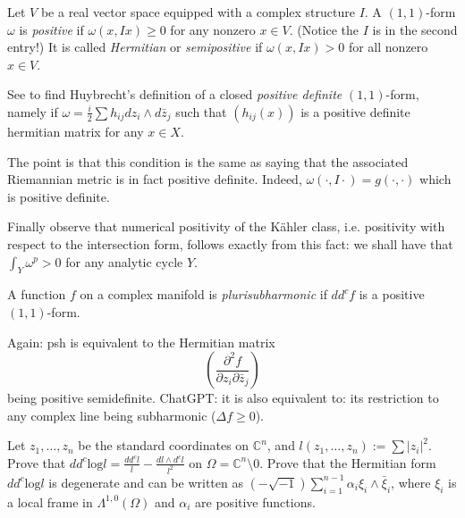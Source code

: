 \documentclass{book}
\begin{document}
\begin{definition}
\label{definition-positive-11form}
Let $V$ be a real vector space equipped with
a complex structure $I$.
A $(1,1)$-form $\omega$ is {\it positive}
if $\omega(x,Ix)\geq 0$ for any nonzero $x
\in V$.
(Notice the $I$ is in the second entry!)
It is called {\it Hermitian} or {\it
semipositive}
if $\omega(x,Ix)>0$ for all nonzero $x \in
V$.
\end{definition}

\noindent
See \cite[Lemma 3.1.7]{huc}
to find Huybrecht's definition of a closed
{\it positive definite}
$(1,1)$-form, namely if
$\omega=\frac{i}{2}\sum h_{ij}dz_i \wedge
d\bar{z}_j$
such that $(h_{ij}(x))$ is a positive
definite hermitian matrix for any $x \in X$.

The point is that this condition
is the same as saying that the associated
Riemannian metric is in fact positive
definite.
Indeed, $\omega(\cdot,I\cdot)=g(\cdot,\cdot)$
which is positive definite.

Finally observe that numerical positivity of
the
Kähler class,
i.e. positivity with respect to the
intersection form,
follows exactly from this fact: we shall have
that
$\int_Y \omega^p>0$ for any analytic cycle
$Y$.

\begin{definition}
\label{definition-psh}
A function $f$ on a complex manifold is
{\it plurisubharmonic} if $dd^cf$ is
a positive $(1,1)$-form.
\end{definition}

\noindent
Again: psh is equivalent to the Hermitian
matrix
$$
\left(\frac{\partial^2 f}{\partial
z_i\partial \bar{z}_j}\right)
$$
being positive semidefinite.
ChatGPT: it is also equivalent to: its
restriction to
any complex line being subharmonic ($\Delta
f\geq 0$).

\begin{exercise}
\label{exercise-logl}
Let $z_1,…,z_n$ be the standard coordinates
on $\mathbb{C}^n$,
and $l(z_1,…,z_n):=\sum|z_i|^2$.
Prove that
$dd^c\text{log}l=\frac{dd^cl}{l}-\frac{dl
\wedge d^cl}{l^2}$
on $\Omega=\mathbb{C}^n\setminus 0$.
Prove that the Hermitian form $dd^c
\text{log} l$
is degenerate and can be written as
$(-\sqrt{-1})\sum_{i=1}^{n-1}
\alpha_i\xi_i\wedge \bar{\xi}_i$,
where $\xi_i$ is a local frame in
$\Lambda^{1,0}(\Omega)$
and $\alpha_i$ are positive functions.
\end{exercise}
\end{document}
